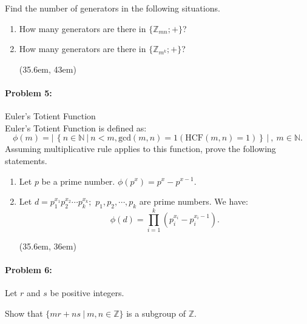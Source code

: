 \documentclass[12pt]{scrartcl}
\begin{document}
{{\begin{spacing}{1.5}
\vspace{0.5em}
Find the number of generators in the following situations.

\begin{enumerate}[label=(\alph*)]
\item How many generators are there in $\{\mathbb{Z}_{mn}; +\}$?

\item How many generators are there in $\{\mathbb{Z}_{m^k}; +\}$?

\vspace{1em}
\framebox(35.6em, 43em){}

\end{enumerate}
\end{spacing}


\paragraph*{Problem 5: }Euler's Totient Function\\

\noindent Euler's Totient Function is defined as:
$$\phi(m) = \big|\hspace{2pt}\left\{n \in \mathbb{N} ~ | ~ n < m, \text{gcd}(m,n) = 1 \left(\text{HCF}(m,n) = 1\right)\right\}\hspace{2pt}\big|~,~ m\in \mathbb{N}.$$
Assuming multiplicative rule applies to this function, prove the following statements.

\begin{enumerate}[label=(\alph*)]
\item Let $p$ be a prime number. $\phi(p^x) = p^x-p^{x-1}.$

\vspace{0.4em}
\item Let $d = p_1^{x_1}p_2^{x_2} \cdots p_k^{x_k};$ $p_1, p_2, \cdots , p_k$ are prime numbers. We have: \vspace{-0.5em}$$\phi(d) = \prod_{i=1}^{k}(p_i^{x_i}-p_i^{x_i-1}).$$

\framebox(35.6em, 36em){}
\end{enumerate}

\paragraph*{Problem 6: }Let $r$ and $s$ be positive integers. 

\vspace{1em}
\noindent Show that $\{mr + ns ~ | ~m, n \in \mathbb{Z}\}$ is a subgroup of $\mathbb{Z}$.\\

}}
\end{document}
